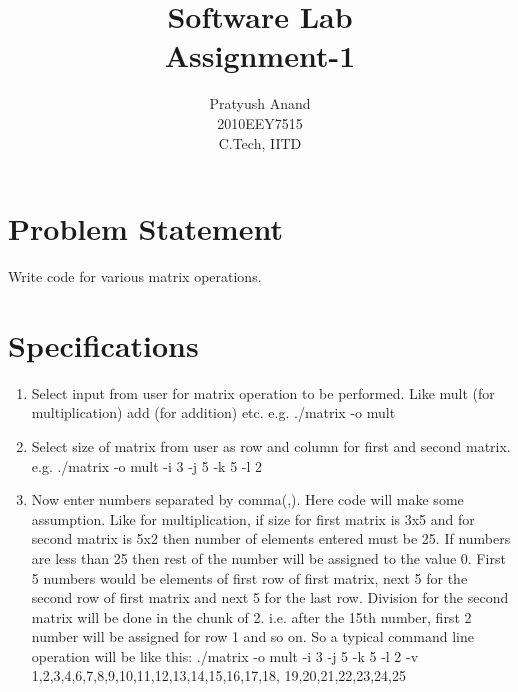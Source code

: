 \documentclass[a4paper,10pt]{report} %
\title{Software Lab \\Assignment-1}
\author{Pratyush Anand \\2010EEY7515 \\C.Tech, IITD}
\begin{document}
  \maketitle

  \chapter{Problem Statement}
    Write code for various matrix operations.

  \chapter{Specifications}
    \begin{enumerate}
      \item Select input from user for matrix operation to be performed.
      Like mult (for multiplication) add (for addition) etc.
      \newline
      e.g. ./matrix -o mult
      \item Select size of matrix from user as row and column for first
      and second matrix.
      \newline
      e.g. ./matrix -o mult -i 3 -j 5 -k 5 -l 2
      \item Now enter numbers separated by comma(,). 
               Here code will make some assumption. Like for
	       multiplication, if size for first matrix is 3x5 and for
	       second matrix is 5x2 then number of elements
	       entered must be 25. If numbers are less than 25 then rest
	       of the number will be assigned to the value 0. First 5 numbers
	       would be elements of first row of first matrix, next 5 for
	       the second row of first matrix and next 5 for the last
	       row. Division for the second matrix will be done in the chunk of 2.
	       i.e. after the 15th number, first 2 number will be assigned for row 1
	       and so on.
      \newline
	So a typical command line operation will be like this:
      \newline
	./matrix -o mult -i 3 -j 5 -k 5 -l 2 -v 1,2,3,4,6,7,8,9,10,11,12,13,14,15,16,17,18,
	19,20,21,22,23,24,25
    \end{enumerate}
\end{document}
